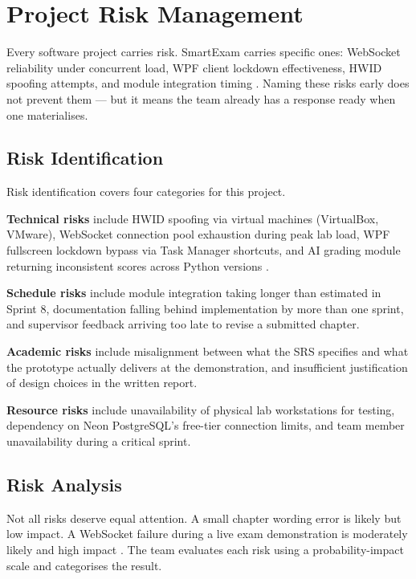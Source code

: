 \section{Project Risk Management}

Every software project carries risk. SmartExam carries specific ones: WebSocket reliability under concurrent load, WPF client lockdown effectiveness, HWID spoofing attempts, and module integration timing \cite{risk1}. Naming these risks early does not prevent them — but it means the team already has a response ready when one materialises.

\subsection{Risk Identification}

Risk identification covers four categories for this project.

\textbf{Technical risks} include HWID spoofing via virtual machines (VirtualBox, VMware), WebSocket connection pool exhaustion during peak lab load, WPF fullscreen lockdown bypass via Task Manager shortcuts, and AI grading module returning inconsistent scores across Python versions \cite{pmc_cbt}.

\textbf{Schedule risks} include module integration taking longer than estimated in Sprint 8, documentation falling behind implementation by more than one sprint, and supervisor feedback arriving too late to revise a submitted chapter.

\textbf{Academic risks} include misalignment between what the SRS specifies and what the prototype actually delivers at the demonstration, and insufficient justification of design choices in the written report.

\textbf{Resource risks} include unavailability of physical lab workstations for testing, dependency on Neon PostgreSQL's free-tier connection limits, and team member unavailability during a critical sprint.

\subsection{Risk Analysis}

Not all risks deserve equal attention. A small chapter wording error is likely but low impact. A WebSocket failure during a live exam demonstration is moderately likely and high impact \cite{risk1}. The team evaluates each risk using a probability-impact scale and categorises the result.

